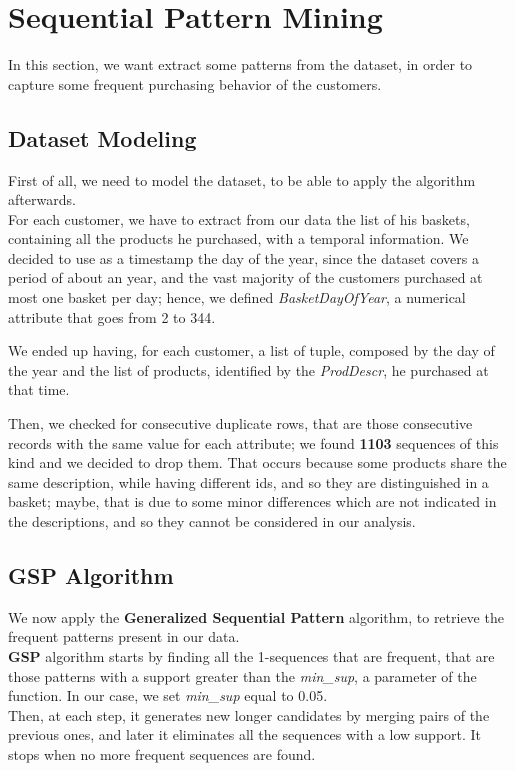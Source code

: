 \section{Sequential Pattern Mining}
In this section, we want extract some patterns from the dataset, in order to capture some frequent purchasing behavior of the customers. 

\subsection{Dataset Modeling}
First of all, we need to model the dataset, to be able to apply the algorithm afterwards.\\
For each customer, we have to extract from our data the list of his baskets, containing all the products he purchased, with a temporal information. 
We decided to use as a timestamp the day of the year, since the dataset covers a period of about an year, and the vast majority of the customers purchased at most one basket per day; hence, we defined \emph{BasketDayOfYear}, a numerical attribute that goes from 2 to 344.

We ended up having, for each customer, a list of tuple, composed by the day of the year and the list of products, identified by the \emph{ProdDescr}, he purchased at that time.

Then, we checked for consecutive duplicate rows, that are those consecutive records with the same value for each attribute; we found \textbf{1103} sequences of this kind and we decided to drop them.
That occurs because some products share the same description, while having different ids, and so they are distinguished in a basket; maybe, that is due to some minor differences which are not indicated in the descriptions, and so they cannot be considered in our analysis.

\subsection{GSP Algorithm}
We now apply the \textbf{Generalized Sequential Pattern} algorithm, to retrieve the frequent patterns present in our data.\\
\textbf{GSP} algorithm starts by finding all the 1-sequences that are frequent, that are those patterns with a support greater than the \emph{min\_sup}, a parameter of the function. In our case, we set \emph{min\_sup} equal to 0.05.\\
Then, at each step, it generates new longer candidates by merging pairs of the previous ones, and later it eliminates all the sequences with a low support. It stops when no more frequent sequences are found.

